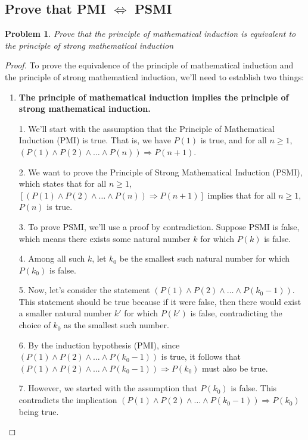 \documentclass{article}
\newtheorem{problem}{Problem}
\newtheorem{proof}
\begin{document}
    \subsection{Prove that PMI $\Leftrightarrow$ PSMI}
    \begin{problem}
        Prove that the principle of mathematical induction is equivalent to the principle of strong mathematical induction
    \end{problem}
    \begin{proof}
        To prove the equivalence of the principle of mathematical induction and the principle of strong mathematical induction, we'll need to establish two things:
    \begin{enumerate}
        \item  \textbf{The principle of mathematical induction implies the principle of strong mathematical induction.}
        \vspace{2mm}

        1. We'll start with the assumption that the Principle of Mathematical Induction (PMI) is true. That is, we have $P(1)$ is true, and for all $n \geq 1$, $(P(1) \land P(2) \land \ldots \land P(n)) \Rightarrow P(n+1)$.

        2. We want to prove the Principle of Strong Mathematical Induction (PSMI), which states that for all $n \geq 1$, $[(P(1) \land P(2) \land \ldots \land P(n)) \Rightarrow P(n+1)]$ implies that for all $n \geq 1$, $P(n)$ is true.

        3. To prove PSMI, we'll use a proof by contradiction. Suppose PSMI is false, which means there exists some natural number $k$ for which $P(k)$ is false.

        4. Among all such $k$, let $k_0$ be the smallest such natural number for which $P(k_0)$ is false.

        5. Now, let's consider the statement $(P(1) \land P(2) \land \ldots \land P(k_0-1))$. This statement should be true because if it were false, then there would exist a smaller natural number $k'$ for which $P(k')$ is false, contradicting the choice of $k_0$ as the smallest such number.

        6. By the induction hypothesis (PMI), since $(P(1) \land P(2) \land \ldots \land P(k_0-1))$ is true, it follows that $(P(1) \land P(2) \land \ldots \land P(k_0-1)) \Rightarrow P(k_0)$ must also be true.

        7. However, we started with the assumption that $P(k_0)$ is false. This contradicts the implication $(P(1) \land P(2) \land \ldots \land P(k_0-1)) \Rightarrow P(k_0)$ being true.


\end{enumerate}
\end{proof}
\end{document}
